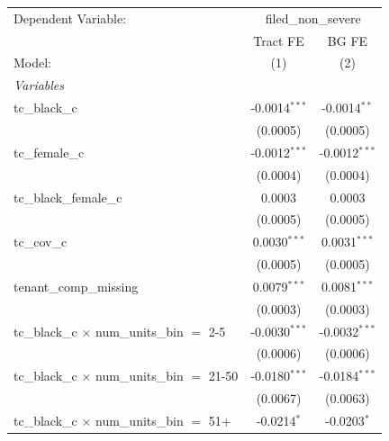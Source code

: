 \begin{tabular}{lcc}
   \tabularnewline \midrule \midrule
   Dependent Variable: & \multicolumn{2}{c}{filed\_non\_severe}\\
                                                         & Tract FE                & BG FE \\   
   Model:                                                & (1)                     & (2)\\  
   \midrule
   \emph{Variables}\\
   tc\_black\_c                                          & -0.0014$^{***}$         & -0.0014$^{**}$\\   
                                                         & (0.0005)                & (0.0005)\\   
   tc\_female\_c                                         & -0.0012$^{***}$         & -0.0012$^{***}$\\   
                                                         & (0.0004)                & (0.0004)\\   
   tc\_black\_female\_c                                  & 0.0003                  & 0.0003\\   
                                                         & (0.0005)                & (0.0005)\\   
   tc\_cov\_c                                            & 0.0030$^{***}$          & 0.0031$^{***}$\\   
                                                         & (0.0005)                & (0.0005)\\   
   tenant\_comp\_missing                                 & 0.0079$^{***}$          & 0.0081$^{***}$\\   
                                                         & (0.0003)                & (0.0003)\\   
   tc\_black\_c $\times$ num\_units\_bin $=$ 2-5         & -0.0030$^{***}$         & -0.0032$^{***}$\\   
                                                         & (0.0006)                & (0.0006)\\   
   tc\_black\_c $\times$ num\_units\_bin $=$ 21-50       & -0.0180$^{***}$         & -0.0184$^{***}$\\   
                                                         & (0.0067)                & (0.0063)\\   
   tc\_black\_c $\times$ num\_units\_bin $=$ 51+         & -0.0214$^{*}$           & -0.0203$^{*}$\\   

\end{tabular}

